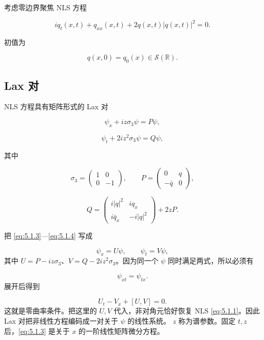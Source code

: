 \documentclass[
    lang=cn,
    scheme=chinese,
    mode=simple,
    device=normal,
    color=blue,
    math=cm,
    thmcnt=section,
    12pt,
    nowatermark
]{elegantbook}
\begin{document}
考虑零边界聚焦 NLS 方程

\begin{equation}
    iq_t(x,t)+q_{xx}(x,t)+2q(x,t)\lvert q(x,t)\rvert^2=0.
    \tag{5.1.1}
    \label{eq:5.1.1}
\end{equation}

初值为

\begin{equation}
    q(x,0)=q_0(x)\in\mathcal S(\mathbb{R}).
    \tag{5.1.2}
    \label{eq:5.1.2}
\end{equation}


\subsection{Lax 对}

NLS 方程具有矩阵形式的 Lax 对

\begin{equation}
    \psi_x+iz\sigma_3\psi=P\psi,
    \tag{5.1.3}
    \label{eq:5.1.3}
\end{equation}

\begin{equation}
    \psi_t+2iz^2\sigma_3\psi=Q\psi,
    \tag{5.1.4}
    \label{eq:5.1.4}
\end{equation}

其中

\[
    \sigma_3=
    \begin{pmatrix}
        1 & 0  \\
        0 & -1
    \end{pmatrix},
    \qquad
    P=
    \begin{pmatrix}
        0       & q \\
        -\bar q & 0
    \end{pmatrix},
\]

\[
    Q=
    \begin{pmatrix}
        i\lvert q\rvert^2 & iq_x               \\
        i\bar q_x         & -i\lvert q\rvert^2
    \end{pmatrix}
    +2zP.
\]

\begin{callout}
    把 \eqref{eq:5.1.3}---\eqref{eq:5.1.4} 写成

    \[
        \psi_x=U\psi,\qquad \psi_t=V\psi,
    \]
    其中 $U=P-iz\sigma_3$、$V=Q-2iz^2\sigma_3$。因为同一个 $\psi$ 同时满足两式，所以必须有

    \[
        \psi_{xt}=\psi_{tx}.
    \]
    展开后得到

    \[
        U_t-V_x+[U,V]=0.
    \]
    这就是零曲率条件。把这里的 $U,V$ 代入，非对角元恰好恢复 NLS \eqref{eq:5.1.1}。因此 Lax 对把非线性方程编码成一对关于 $\psi$ 的线性系统。
    $z$ 称为谱参数。固定 $t,z$ 后，\eqref{eq:5.1.3} 是关于 $x$ 的一阶线性矩阵微分方程。
\end{callout}
\end{document}
